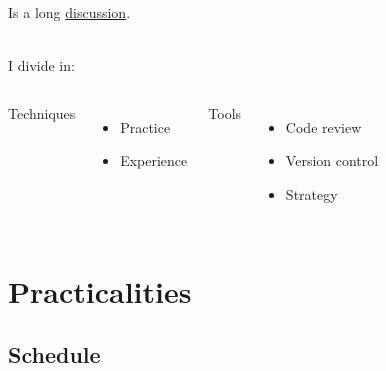\documentclass[usenames,dvipsnames]{beamer}
\theoremstyle{plain}
\theoremstyle{definition}
\begin{document}
\begin{frame}{\setframetitle{}}
    Is a long  \href{https://medium.com/@isaaclyman/steps-to-better-code-e6c3cce0c7f9}{\color{gray} discussion}. \vspace{1cm}

    \\
    I divide in: %
  \begin{columns}[t]
    \centering
    Techniques
    \begin{itemize}
    \item Practice
    \item Experience
    \end{itemize}
    \centering
    Tools
    \begin{itemize}
    \item Code review
    \item Version control
    \item Strategy
    \end{itemize}
  \end{columns}
\end{frame}






\section{Practicalities}
\subsection{Schedule}
\end{document}
